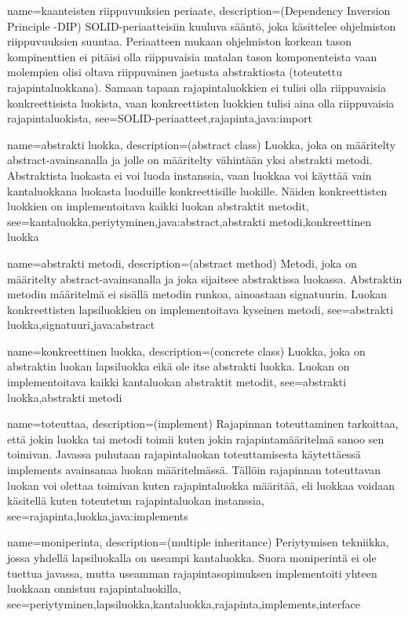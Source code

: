 {
	name=kaanteisten riippuvuuksien periaate,
	description={(Dependency Inversion Principle -DIP) SOLID-periaatteisiin kuuluva sääntö, joka
käsittelee ohjelmiston riippuvuuksien suuntaa. Periaatteen mukaan ohjelmiston korkean tason
kompinenttien ei pitäisi olla riippuvaisia matalan tason komponenteista vaan molempien olisi
oltava riippuvainen jaetusta abstraktiosta (toteutettu rajapintaluokkana). Samaan tapaan
rajapintaluokkien ei tulisi olla riippuvaisia konkreettisista luokista, vaan konkreettisten 
luokkien tulisi aina olla riippuvaisia rajapintaluokista},
	see={SOLID-periaatteet,rajapinta,java:import}
}

{
	name=abstrakti luokka,
	description={(abstract class) Luokka, joka on määritelty abstract-avainsanalla ja jolle on
määritelty vähintään yksi abstrakti metodi. Abstraktista luokasta ei voi luoda instanssia, vaan
luokkaa voi käyttää vain kantaluokkana luokasta luoduille konkreettisille luokille. Näiden
konkreettisten luokkien on implementoitava kaikki luokan abstraktit metodit},
	see={kantaluokka,periytyminen,java:abstract,abstrakti metodi,konkreettinen luokka}
}

{
	name=abstrakti metodi,
	description={(abstract method) Metodi, joka on määritelty abstract-avainsanalla ja joka
sijaitsee abstraktissa luokassa. Abstraktin metodin määritelmä ei sisällä metodin runkoa,
ainoastaan signatuurin. Luokan konkreettisten lapsiluokkien on implementoitava kyseinen metodi},
	see={abstrakti luokka,signatuuri,java:abstract}
}

{
	name=konkreettinen luokka,
	description={(concrete class) Luokka, joka on abstraktin luokan lapsiluokka eikä ole itse
abstrakti luokka. Luokan on implementoitava kaikki kantaluokan abstraktit metodit},
	see={abstrakti luokka,abstrakti metodi}
}

{
	name=toteuttaa,
	description={(implement) Rajapinnan toteuttaminen tarkoittaa, että jokin luokka tai metodi
toimii kuten jokin rajapintamääritelmä sanoo sen toimivan. Javassa puhutaan rajapintaluokan
toteuttamisesta käytettäessä implements avainsanaa luokan määritelmässä. Tällöin rajapinnan
toteuttavan luokan voi olettaa toimivan kuten rajapintaluokka määritää, eli luokkaa voidaan
käsitellä kuten toteutetun rajapintaluokan instanssia},
	see={rajapinta,luokka,java:implements}
}

{
	name=moniperinta,
	description={(multiple inheritance) Periytymisen tekniikka, jossa yhdellä lapsiluokalla on
useampi kantaluokka. Suora moniperintä ei ole tuettua javassa, mutta useamman rajapintasopimuksen
implementoiti yhteen luokkaan onnistuu rajapintaluokilla},
	see={periytyminen,lapsiluokka,kantaluokka,rajapinta,implements,interface}
}